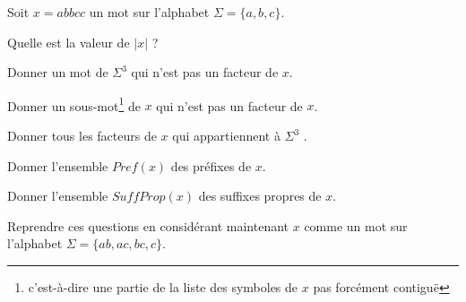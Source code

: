 
\begingroup

\begin{exercice}[Mots]\label{exo:introduction/languages/words}

  Soit $x = abbcc$ un mot sur l'alphabet $\Sigma = \{a, b, c\}$.
  \begin{questions}
  \item Quelle est la valeur de $|x|$ ?
  \item Donner un mot de $\Sigma^3$ qui n'est pas un facteur de $x$.
  \item Donner un sous-mot\footnote{c'est-à-dire une partie de la liste des symboles de $x$ pas forcément contiguë} de $x$ qui n'est pas un facteur de $x$.
  \item Donner tous les facteurs de $x$ qui appartiennent à $\Sigma^3$ .
  \item Donner l'ensemble $\mathit{Pref}(x)$ des préfixes de $x$.
  \item Donner l'ensemble $\mathit{SuffProp}(x)$ des suffixes propres de $x$.
  \end{questions}
  Reprendre ces questions en considérant maintenant $x$ comme un mot sur
  l'alphabet $\Sigma = \{ab, ac, bc, c\}$.

\end{exercice}

